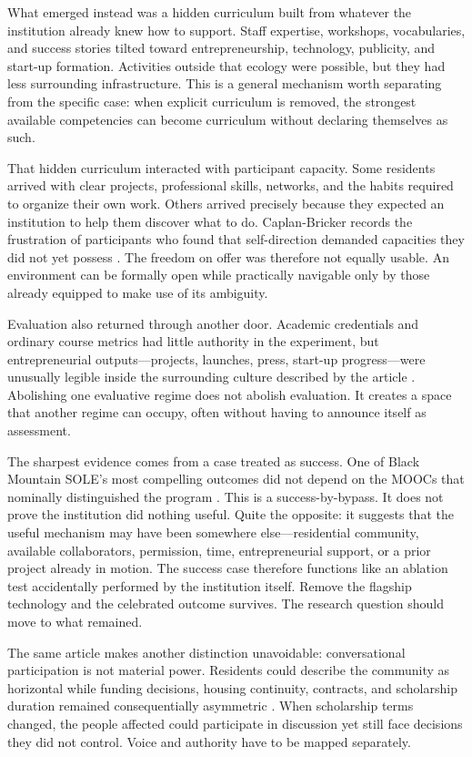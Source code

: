 \documentclass[11pt]{article}
\begin{document}
What emerged instead was a hidden curriculum built from whatever the institution already knew how to support. Staff expertise, workshops, vocabularies, and success stories tilted toward entrepreneurship, technology, publicity, and start-up formation. Activities outside that ecology were possible, but they had less surrounding infrastructure. This is a general mechanism worth separating from the specific case: when explicit curriculum is removed, the strongest available competencies can become curriculum without declaring themselves as such.

That hidden curriculum interacted with participant capacity. Some residents arrived with clear projects, professional skills, networks, and the habits required to organize their own work. Others arrived precisely because they expected an institution to help them discover what to do. Caplan-Bricker records the frustration of participants who found that self-direction demanded capacities they did not yet possess \cite{caplanbricker2013blackmountain}. The freedom on offer was therefore not equally usable. An environment can be formally open while practically navigable only by those already equipped to make use of its ambiguity.

Evaluation also returned through another door. Academic credentials and ordinary course metrics had little authority in the experiment, but entrepreneurial outputs---projects, launches, press, start-up progress---were unusually legible inside the surrounding culture described by the article \cite{caplanbricker2013blackmountain}. Abolishing one evaluative regime does not abolish evaluation. It creates a space that another regime can occupy, often without having to announce itself as assessment.

The sharpest evidence comes from a case treated as success. One of Black Mountain SOLE's most compelling outcomes did not depend on the MOOCs that nominally distinguished the program \cite{caplanbricker2013blackmountain}. This is a success-by-bypass. It does not prove the institution did nothing useful. Quite the opposite: it suggests that the useful mechanism may have been somewhere else---residential community, available collaborators, permission, time, entrepreneurial support, or a prior project already in motion. The success case therefore functions like an ablation test accidentally performed by the institution itself. Remove the flagship technology and the celebrated outcome survives. The research question should move to what remained.

The same article makes another distinction unavoidable: conversational participation is not material power. Residents could describe the community as horizontal while funding decisions, housing continuity, contracts, and scholarship duration remained consequentially asymmetric \cite{caplanbricker2013blackmountain}. When scholarship terms changed, the people affected could participate in discussion yet still face decisions they did not control. Voice and authority have to be mapped separately.
\end{document}
